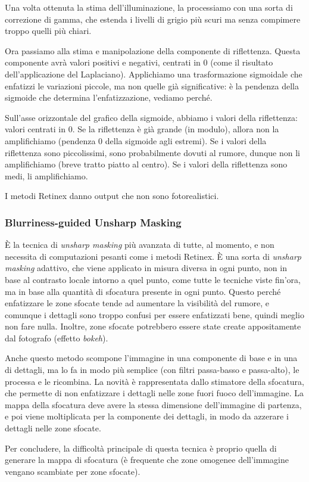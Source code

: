 \documentclass[a4paper,11pt]{article}
\begin{document}
Una volta ottenuta la stima dell'illuminazione, la processiamo con una sorta di correzione di gamma, che estenda i livelli di grigio più scuri ma senza compimere
troppo quelli più chiari.
\par
Ora passiamo alla stima e manipolazione della componente di riflettenza. Questa componente avrà valori positivi e negativi, centrati in 0 (come il risultato
dell'applicazione del Laplaciano). Applichiamo una trasformazione sigmoidale che enfatizzi le variazioni piccole, ma non quelle già significative: è la
pendenza della sigmoide che determina l'enfatizzazione, vediamo perché.
\par
Sull'asse orizzontale del grafico della sigmoide, abbiamo i valori della riflettenza: valori centrati in 0. Se la riflettenza è già grande (in modulo), allora non la amplifichiamo
(pendenza 0 della sigmoide agli estremi). Se i valori della riflettenza sono piccolissimi, sono probabilmente dovuti al rumore, dunque non li amplifichiamo (breve tratto piatto
al centro). Se i valori della riflettenza sono medi, li amplifichiamo.
\par
I metodi Retinex danno output che non sono fotorealistici.

\subsubsection{Blurriness-guided Unsharp Masking}
È la tecnica di \textit{unsharp masking} più avanzata di tutte, al momento, e non necessita di computazioni pesanti come i metodi Retinex.
È una sorta di \textit{unsharp masking} adattivo, che viene applicato in misura diversa in ogni punto, non in base al contrasto locale intorno a quel punto,
come tutte le tecniche viste fin'ora, ma in base alla quantità di sfocatura presente in ogni punto. Questo perché enfatizzare le zone sfocate
tende ad aumentare la visibilità del rumore, e comunque i dettagli sono troppo confusi per essere enfatizzati bene, quindi meglio non fare nulla. Inoltre, zone sfocate potrebbero
essere state create appositamente dal fotografo (effetto \textit{bokeh}).
\par
Anche questo metodo scompone l'immagine in una componente di base e in una di dettagli, ma lo fa in modo più semplice (con filtri passa-basso e passa-alto),
le processa e le ricombina. La novità è rappresentata dallo stimatore della sfocatura, che permette di non enfatizzare i dettagli nelle zone
fuori fuoco dell'immagine. La mappa della sfocatura deve avere la stessa dimensione dell'immagine di partenza, e poi viene moltiplicata
per la componente dei dettagli, in modo da azzerare i dettagli nelle zone sfocate.
\par
Per concludere, la difficoltà principale di questa tecnica è proprio quella di generare la mappa di sfocatura (è frequente che zone omogenee dell'immagine vengano scambiate
per zone sfocate).
\end{document}
